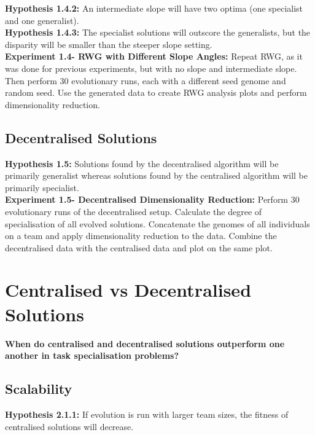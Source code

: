 \documentclass[12pt]{article}
\begin{document}
\textbf{Hypothesis 1.4.2:} An intermediate slope will have two optima (one specialist and one generalist).\\

\textbf{Hypothesis 1.4.3:} The specialist solutions will outscore the generalists, but the disparity will be smaller than the steeper slope setting. \\

\textbf{Experiment 1.4- RWG with Different Slope Angles:} Repeat RWG, as it was done for previous experiments, but with no slope and intermediate slope.
Then perform 30 evolutionary runs, each with a different seed genome and random seed.
Use the generated data to create RWG analysis plots and perform dimensionality reduction.\\

\subsection{Decentralised Solutions} 

\textbf{Hypothesis 1.5:} Solutions found by the decentralised algorithm will be primarily generalist whereas solutions found by the centralised algorithm will be primarily specialist.\\

\textbf{Experiment 1.5- Decentralised Dimensionality Reduction:} Perform 30 evolutionary runs of the decentralised setup.
Calculate the degree of specialisation of all evolved solutions.
Concatenate the genomes of all individuals on a team and apply dimensionality reduction to the data.
Combine the decentralised data with the centralised data and plot on the same plot.\\

\section{Centralised vs Decentralised Solutions}

\textbf{When do centralised and decentralised solutions outperform one another in task specialisation problems?}\\

\subsection{Scalability}

\textbf{Hypothesis 2.1.1:} If evolution is run with larger team sizes, the fitness of centralised solutions will decrease.\\
\end{document}
